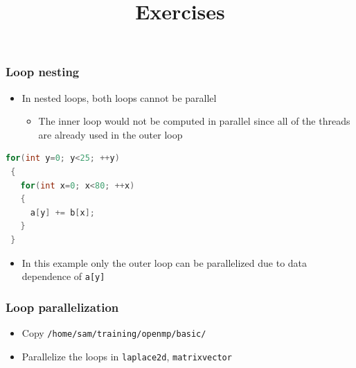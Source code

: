 \documentclass[xcolor=table,10pt,final]{beamer}
\begin{document}
\begin{frame}[fragile]
  \frametitle{Loop nesting}
  \begin{itemize}
    \item In nested loops, both loops cannot be parallel
      \begin{itemize}
	\item The inner loop would not be computed in parallel since all of the threads are already used in the outer loop
      \end{itemize}
  \end{itemize}
  \begin{lstlisting}[language=C++]
 for(int y=0; y<25; ++y)
 {
   for(int x=0; x<80; ++x)
   {
     a[y] += b[x];
   }
 }
  \end{lstlisting}
  \begin{itemize}
    \item In this example only the outer loop can be parallelized due to data dependence of {\tt a[y]}
  \end{itemize}
\end{frame}



\title{Exercises}
\author{}
\date{}
\frame{\titlepage}

\begin{frame}[fragile]
  \frametitle{Loop parallelization}
  \begin{itemize}
    \item Copy {\tt /home/sam/training/openmp/basic/}
    \item Parallelize the loops in {\tt laplace2d}, {\tt matrixvector}
  \end{itemize}
\end{frame}

\begin{frame}
\end{frame}
\end{document}
